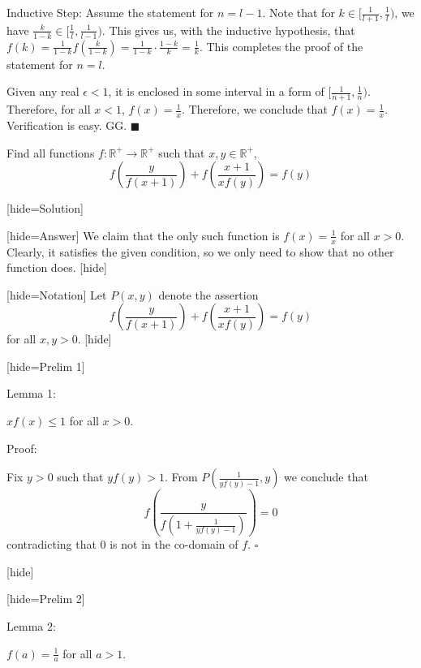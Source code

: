 \begin{solution}
Inductive Step: Assume the statement for $n=l-1$. 
Note that for $k \in [\frac{1}{l+1},\frac{1}{l})$, we have $\frac{k}{1-k} \in [\frac{1}{l},\frac{1}{l-1})$.
This gives us, with the inductive hypothesis, that $f(k)=\frac{1}{1-k}f(\frac{k}{1-k}) = \frac{1}{1-k} \cdot \frac{1-k}{k} = \frac{1}{k}$.
This completes the proof of the statement for $n=l$.

Given any real $\epsilon < 1$, it is enclosed in some interval in a form of $[\frac{1}{n+1}, \frac{1}{n})$.
Therefore, for all $x<1$, $f(x)=\frac{1}{x}$. Therefore, we conclude that $f(x)=\frac{1}{x}$. Verification is easy. GG. $\blacksquare$
\end{solution}



\begin{solution}
	\begin{tcolorbox}Find all functions $f:\mathbb{R}^{+}\rightarrow \mathbb{R}^{+}$ such that 
$x,y\in \mathbb{R}^{+},$ \[ f\left(\frac{y}{f(x+1)}\right)+f\left(\frac{x+1}{xf(y)}\right)=f(y) \]\end{tcolorbox}

[hide=Solution]

[hide=Answer] We claim that the only such function is $f(x)=\frac{1}{x}$ for all $x>0$. Clearly, it satisfies the given condition, so we only need to show that no other function does. [\/hide]

[hide=Notation] Let $P(x,y)$ denote the assertion $$f\left(\frac{y}{f(x+1)}\right)+f\left(\frac{x+1}{xf(y)}\right)=f(y)$$ for all $x,y>0$.
[\/hide]

[hide=Prelim 1] \begin{bolded}Lemma 1:\end{bolded} $xf(x) \le 1$ for all $x>0$.

\begin{italicized}Proof:\end{italicized} Fix $y>0$ such that $yf(y)>1$. From $P\left(\frac{1}{yf(y)-1},y\right)$ we conclude that $$f\left(\frac{y}{f\left(1+\frac{1}{yf(y)-1}\right)}\right)=0$$ contradicting that $0$ is not in the co-domain of $f$. $\square$

[\/hide]

[hide=Prelim 2] \begin{bolded}Lemma 2:\end{bolded} $f(a)=\frac{1}{a}$ for all $a>1$.


\end{solution}
